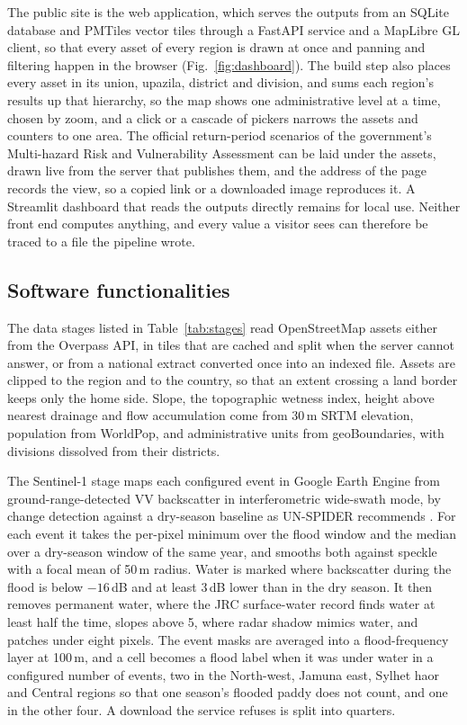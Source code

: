 \documentclass[preprint,12pt]{elsarticle}
\begin{document}
The public site is the web application, which serves the outputs from an SQLite database and PMTiles vector tiles through a FastAPI service and a MapLibre GL client, so that every asset of every region is drawn at once and panning and filtering happen in the browser (Fig.~\ref{fig:dashboard}). The build step also places every asset in its union, upazila, district and division, and sums each region's results up that hierarchy, so the map shows one administrative level at a time, chosen by zoom, and a click or a cascade of pickers narrows the assets and counters to one area. The official return-period scenarios of the government's Multi-hazard Risk and Vulnerability Assessment can be laid under the assets, drawn live from the server that publishes them, and the address of the page records the view, so a copied link or a downloaded image reproduces it. A Streamlit dashboard that reads the outputs directly remains for local use. Neither front end computes anything, and every value a visitor sees can therefore be traced to a file the pipeline wrote.

\subsection{Software functionalities}

The data stages listed in Table~\ref{tab:stages} read OpenStreetMap assets either from the Overpass API, in tiles that are cached and split when the server cannot answer, or from a national extract converted once into an indexed file. Assets are clipped to the region and to the country, so that an extent crossing a land border keeps only the home side. Slope, the topographic wetness index, height above nearest drainage and flow accumulation come from 30\,m SRTM elevation, population from WorldPop, and administrative units from geoBoundaries, with divisions dissolved from their districts.

The Sentinel-1 stage maps each configured event in Google Earth Engine from ground-range-detected VV backscatter in interferometric wide-swath mode, by change detection against a dry-season baseline as UN-SPIDER recommends \citep{unspider}. For each event it takes the per-pixel minimum over the flood window and the median over a dry-season window of the same year, and smooths both against speckle with a focal mean of 50\,m radius. Water is marked where backscatter during the flood is below $-16$\,dB and at least 3\,dB lower than in the dry season. It then removes permanent water, where the JRC surface-water record \citep{pekel2016} finds water at least half the time, slopes above 5\textdegree{}, where radar shadow mimics water, and patches under eight pixels. The event masks are averaged into a flood-frequency layer at 100\,m, and a cell becomes a flood label when it was under water in a configured number of events, two in the North-west, Jamuna east, Sylhet haor and Central regions so that one season's flooded paddy does not count, and one in the other four. A download the service refuses is split into quarters.
\end{document}
